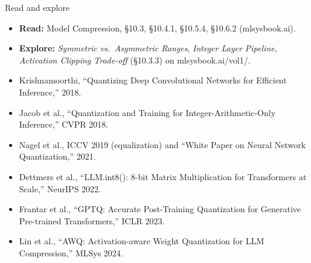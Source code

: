 \documentclass[aspectratio=169, 12pt]{beamer}
\begin{document}
\begin{frame}{Read and explore}
  \vspace{-0.1cm}
  \footnotesize
  \begin{itemize}\setlength{\itemsep}{0.04cm}
    \item \textbf{Read:} Model Compression, \S10.3, \S10.4.1, \S10.5.4, \S10.6.2 (mlsysbook.ai).
    \item \textbf{Explore:} \textit{Symmetric vs.\ Asymmetric Ranges}, \textit{Integer Layer Pipeline}, \textit{Activation Clipping Trade-off} (\S10.3.3) on mlsysbook.ai/vol1/.
    \item Krishnamoorthi, ``Quantizing Deep Convolutional Networks for Efficient Inference,'' 2018.
    \item Jacob et al., ``Quantization and Training for Integer-Arithmetic-Only Inference,'' CVPR 2018.
    \item Nagel et al., ICCV 2019 (equalization) and ``White Paper on Neural Network Quantization,'' 2021.
    \item Dettmers et al., ``LLM.int8(): 8-bit Matrix Multiplication for Transformers at Scale,'' NeurIPS 2022.
    \item Frantar et al., ``GPTQ: Accurate Post-Training Quantization for Generative Pre-trained Transformers,'' ICLR 2023.
    \item Lin et al., ``AWQ: Activation-aware Weight Quantization for LLM Compression,'' MLSys 2024.
  \end{itemize}
\end{frame}
\end{document}
